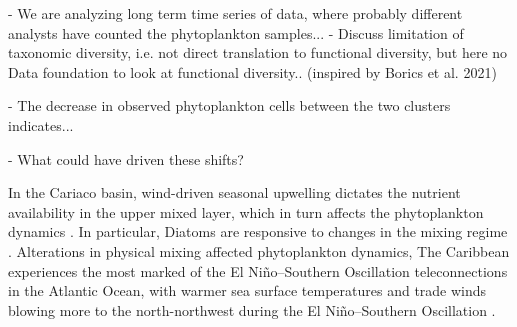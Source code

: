 \documentclass[draft]{agujournal2019}
\begin{document}

- We are analyzing long term time series of data, where probably different analysts have counted the phytoplankton samples...
- Discuss limitation of taxonomic diversity, i.e. not direct translation to functional diversity, but here no Data foundation to look at functional diversity.. (inspired by Borics et al. 2021)

- The decrease in observed phytoplankton cells between the two clusters indicates...

- What could have driven these shifts?



In the Cariaco basin, wind-driven seasonal upwelling dictates the nutrient availability in the upper mixed layer, which in turn affects the phytoplankton dynamics \cite{ptacnik_diversity_2008, bopp_response_2005}. In particular, Diatoms are responsive to changes in the mixing regime \cite{huisman_reduced_2006}.
Alterations in physical mixing affected phytoplankton dynamics,
The Caribbean experiences the most marked of the El Niño–Southern Oscillation teleconnections in the Atlantic Ocean, with warmer sea surface temperatures and trade winds blowing more to the north-northwest during the El Niño–Southern Oscillation \cite{enfield_tropical_1997}.
\end{document}
